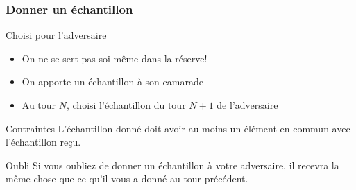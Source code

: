\documentclass{beamer}
\begin{document}
\begin{frame}
    \frametitle{Donner un échantillon}
    \begin{block}{Choisi pour l’adversaire}
        \begin{itemize}
            \item On ne se sert pas soi-même dans la réserve!
            \item On apporte un échantillon à son camarade
            \item Au tour $N$, choisi l'échantillon du tour $N + 1$ de
                l'adversaire
        \end{itemize}
    \end{block}
    \begin{block}{Contraintes}
        L'échantillon donné doit avoir au moins un élément en commun avec
        l'échantillon reçu.
    \end{block}
    \begin{block}{Oubli}
        Si vous oubliez de donner un échantillon à votre adversaire, il recevra
        la même chose que ce qu’il vous a donné au tour précédent.
    \end{block}
\end{frame}
\end{document}
